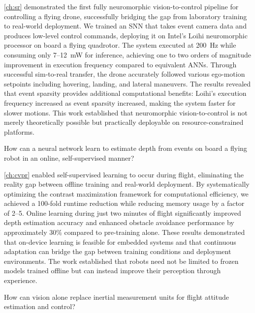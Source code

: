 \cref{ch:sr} demonstrated the first fully neuromorphic vision-to-control pipeline for controlling a flying drone, successfully bridging the gap from laboratory training to real-world deployment. We trained an SNN that takes event camera data and produces low-level control commands, deploying it on Intel's Loihi neuromorphic processor on board a flying quadrotor. The system executed at 200~Hz while consuming only 7--12~mW for inference, achieving one to two orders of magnitude improvement in execution frequency compared to equivalent ANNs. Through successful sim-to-real transfer, the drone accurately followed various ego-motion setpoints including hovering, landing, and lateral maneuvers. The results revealed that event sparsity provides additional computational benefits: Loihi's execution frequency increased as event sparsity increased, making the system faster for slower motions. This work established that neuromorphic vision-to-control is not merely theoretically possible but practically deployable on resource-constrained platforms.

\begin{tcolorbox}[title={\textbf{Research Question 3}}]
    How can a neural network learn to estimate depth from events on board a flying robot in an online, self-supervised manner?
\end{tcolorbox}

\cref{ch:cvpr} enabled self-supervised learning to occur during flight, eliminating the reality gap between offline training and real-world deployment. By systematically optimizing the contrast maximization framework for computational efficiency, we achieved a 100-fold runtime reduction while reducing memory usage by a factor of 2--5. Online learning during just two minutes of flight significantly improved depth estimation accuracy and enhanced obstacle avoidance performance by approximately 30\% compared to pre-training alone. These results demonstrated that on-device learning is feasible for embedded systems and that continuous adaptation can bridge the gap between training conditions and deployment environments. The work established that robots need not be limited to frozen models trained offline but can instead improve their perception through experience.

\begin{tcolorbox}[title={\textbf{Research Question 4}}]
    How can vision alone replace inertial measurement units for flight attitude estimation and control?
\end{tcolorbox}

